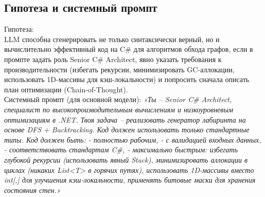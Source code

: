 \subsection{Гипотеза и системный промпт}
Гипотеза: \\
LLM способна сгенерировать не только синтаксически верный, но и вычислительно эффективный код на C\# для алгоритмов обхода графов, если в промпте задать роль Senior C\# Architect, явно указать требования к производительности (избегать рекурсии, минимизировать GC-аллокации, использовать 1D-массивы для кэш-локальности) и попросить сначала описать план оптимизации (Chain-of-Thought).\\
\vspace{0.5em}
Системный промпт (для основной модели):
\textit{«Ты – Senior C\# Architect, специалист по высокопроизводительным вычислениям и низкоуровневым оптимизациям в .NET. Твоя задача – реализовать генератор лабиринта на основе DFS + Backtracking. Код должен использовать только стандартные типы. 
Код должен быть:
- полностью рабочим,
- с валидацией входных данных,
- соответствовать стандартам C\#,
- максимально быстрым: избегать глубокой рекурсии (использовать явный Stack), минимизировать аллокации в циклах (никаких List<T> в горячих путях), использовать 1D-массивы вместо int[,] для улучшения кэш-локальности, применять битовые маски для хранения состояния стен.»}

